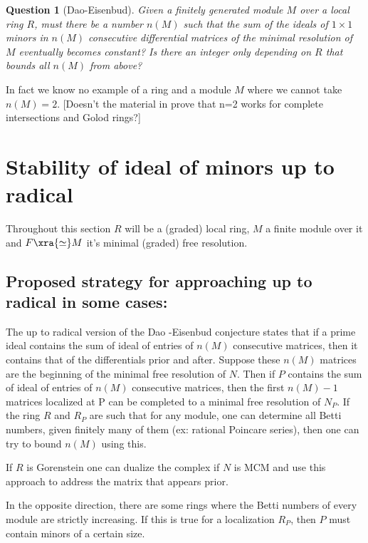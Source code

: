 \documentclass[a4,12pt]{amsart}
\numberwithin{equation}{section}
\newtheorem{question}[equation]{Question}
\theoremstyle{definition}
\theoremstyle{remark}
\numberwithin{equation}{section}
\def\F{F}
\begin{document}
\begin{question}[Dao-Eisenbud]\label{DE_conjecture}
    Given a finitely generated module $M$ over a local ring $R$, must there be a number $n(M)$ such that the sum of the ideals of $1\times 1$ minors in $n(M)$ consecutive differential matrices of the minimal resolution of $M$ eventually becomes constant? Is there an integer only depending on $R$ that bounds all $n(M)$ from above?


\end{question}

In fact we know no example of a ring and a module $M$ where we cannot take $n(M) = 2$. [Doesn't the material in \cite{DMS} prove that
n=2 works for complete intersections and Golod rings?]

 \section{Stability of ideal of minors up to radical}

 Throughout this section $R$ will be a (graded) local ring, $M$ a finite module over it and $\F\xra{\simeq} M$ it's minimal (graded) free resolution.

\par 

 \subsection*{Proposed strategy for approaching  up to radical in some cases:} 
 The up to radical version of the Dao -Eisenbud conjecture states that if a prime ideal contains the sum of ideal of entries of $n(M)$ consecutive matrices, then it contains that of the differentials prior and after. Suppose these $n(M)$ matrices are the beginning of the minimal free resolution of $N$. Then if $P$ contains the sum of ideal of entries of $n(M)$ consecutive matrices, then the first $n(M)-1$ matrices localized at P can be completed to a minimal free resolution of $N_P$. If the ring $R$ and $R_P$ are such that for any module, one can determine all Betti numbers, given finitely many of them (ex: rational Poincare series), then one can try to bound $n(M)$ using this.
 
If $R$ is Gorenstein one can dualize the complex if $N$ is MCM and use this approach to address the matrix that appears prior.

In the opposite direction, there are some rings where the Betti numbers
of every module are strictly increasing. If this is true for
a localization $R_P$, then $P$ must contain minors of a certain size.
\end{document}
